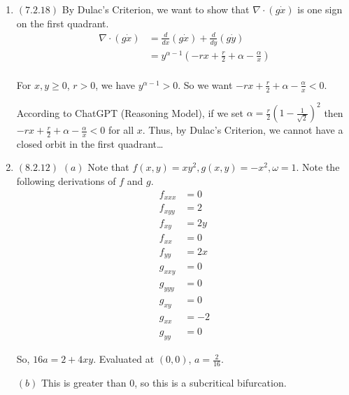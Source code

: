 \documentclass[12pt]{article}
\begin{document}
\begin{enumerate}[start=1,label={\bfseries Problem \arabic*:},leftmargin=1in]
     \item $(7.2.18)$ By Dulac's Criterion, we want to show that $\nabla \cdot (g\dot{x})$ is one sign on the first quadrant.  
     \begin{align*}
        \nabla \cdot (g\dot{x}) &=  \frac{d}{dx} (g\dot{x}) + \frac{d}{dy}(g\dot{y}) \\ 
        &= y^{\alpha - 1} (-rx + \frac{r}{2} + \alpha - \frac{\alpha}{x})\\ 
     \end{align*}

     For $x, y \geq 0$, $r > 0$, we have $y^{\alpha-1} > 0$. 
     So we want $-rx + \frac{r}{2} + \alpha - \frac{\alpha}{x} < 0$. 

     According to ChatGPT (Reasoning Model), if we set $\alpha = \frac{r}{2}(1 - \frac{1}{\sqrt{2}})^2$ then $-rx + \frac{r}{2} + \alpha - \frac{\alpha}{x} < 0$ for all $x$. 
     Thus, by Dulac's Criterion, we cannot have a closed orbit in the first quadrant\dots
     
     \item $(8.2.12)$ 
     $(a)$
     Note that $f(x, y) = xy^2, g(x, y) = -x^2, \omega = 1$. Note the following derivations of $f$ and $g$.   
     \begin{align*}
        f_{xxx} &= 0\\
        f_{xyy} &= 2\\ 
        f_{xy} &= 2y\\ 
        f_{xx} &= 0\\ 
        f_{yy} &= 2x\\ 
        g_{xxy} &= 0\\ 
        g_{yyy} &= 0\\ 
        g_{xy} &= 0 \\
        g_{xx} &= -2\\
        g_{yy} &= 0
      \end{align*}

      So, $16a = 2 + 4xy$. Evaluated at $(0, 0)$, $a = \frac{2}{16}$. 
      
    $(b)$ This is greater than 0, so this is a subcritical bifurcation.
    \end{enumerate}
\end{document}
